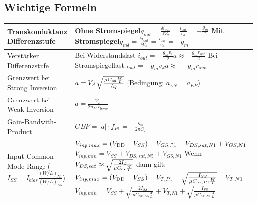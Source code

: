 \subsection{Wichtige Formeln}
\renewcommand{\arraystretch}{2}
\begin{tabular}{|l|l|}
\hline
Transkonduktanz Differenzstufe & \makecell[l]{Ohne Stromspiegel\hspace{10pt}$g_{md} = \frac{\delta i_{out}}{\delta V_d} = \frac{i_{out}}{v_d}=-\frac{g_m}{2}$\\Mit Stromspiegel\hspace{10pt}$g_{md} = \frac{\delta i_{out}}{\delta V_d} = \frac{i_{out}}{v_d}=-g_m$}\\
\hline
Verstärker Differenzstufe & \makecell[l]{Bei Widerstandslast\hspace{10pt} $i_{out}=-\frac{g_m v_d}{2}$\hspace{20pt}$a\approx - \frac{g_m r_{out}}{2}$\\Bei Stromspiegellast\hspace{10pt} $i_{out}=-g_m v_d$\hspace{20pt}$a\approx\ -g_m r_{out}$}\\
\hline
Grenzwert bei Strong Inversion & $a = V_A\sqrt{\frac{\mu C_{\rm ox}\frac{W}{L}}{I_Q}}$ (Bedingung: $a_{EN} = a_{EP}$)\\
\hline
Grenzwert bei Weak Inversion & $a = \frac{V_A}{2 n_M V_{temp}}$\\
\hline
Gain-Bandwith-Product & $GBP = |a|\cdot f_{P1} = -\frac{g_m}{2\pi C_L}$\\
\hline
\makecell[l]{Input Common Mode Range\\($I_{SS}= I_{bias}\frac{(W/L)_{N1}}{(W/L)_{N5}}$)}& \makecell[l]{$V_{inp,max} = (V_{\rm DD}-V_{SS})-V_{GS,P1}-V_{DS,sat,N1}+V_{GS,N1}$\\$V_{inp,min} = V_{SS}+V_{DS,sat,N5}+V_{GS,N1}$ \vspace{5pt}\\Wenn $V_{DS,sat}\approx\sqrt{\frac{2I_D}{\mu C_{\rm ox}\frac{W}{L}}}$ dann gilt:\\$V_{inp,max} = (V_{\rm DD}-V_{SS})-V_{T,P1}-\sqrt{\frac{I_{SS}}{\mu C_{ox,P1}\frac{W}{L}}}+V_{T,N1}$\\$V_{inp,min} = V_{SS}+\sqrt{\frac{2I_{SS}}{\mu C_{ox,N5}\frac{W}{L}}}+V_{T,N1}+\sqrt{\frac{I_{SS}}{\mu C_{ox,N1}\frac{W}{L}}}$}\\
\hline

\end{tabular}
